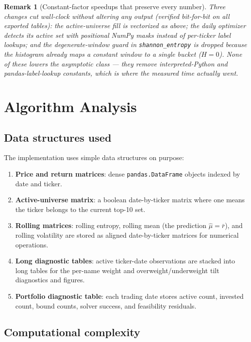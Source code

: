 \documentclass[a4paper,12pt]{article}
\newtheorem{remark}{Remark}[section]
\begin{document}
\begin{remark}[Constant-factor speedups that preserve every number]
Three changes cut wall-clock without altering any output (verified bit-for-bit on all exported tables): the active-universe fill is vectorized as above; the daily optimizer detects its active set with positional NumPy masks instead of per-ticker label lookups; and the degenerate-window guard in \texttt{shannon\_entropy} is dropped because the histogram already maps a constant window to a single bucket ($H=0$). None of these lowers the asymptotic class --- they remove interpreted-Python and pandas-label-lookup constants, which is where the measured time actually went.
\end{remark}

\section{Algorithm Analysis}

\subsection{Data structures used}

The implementation uses simple data structures on purpose:
\begin{enumerate}[label=\arabic*.]
    \item \textbf{Price and return matrices}: dense \texttt{pandas.DataFrame} objects indexed by date and ticker.
    \item \textbf{Active-universe matrix}: a boolean date-by-ticker matrix where one means the ticker belongs to the current top-10 set.
    \item \textbf{Rolling matrices}: rolling entropy, rolling mean (the prediction $\widehat\mu=\bar r$), and rolling volatility are stored as aligned date-by-ticker matrices for numerical operations.
    \item \textbf{Long diagnostic tables}: active ticker-date observations are stacked into long tables for the per-name weight and overweight/underweight tilt diagnostics and figures.
    \item \textbf{Portfolio diagnostic table}: each trading date stores active count, invested count, bound counts, solver success, and feasibility residuals.
\end{enumerate}

\subsection{Computational complexity}
\end{document}
